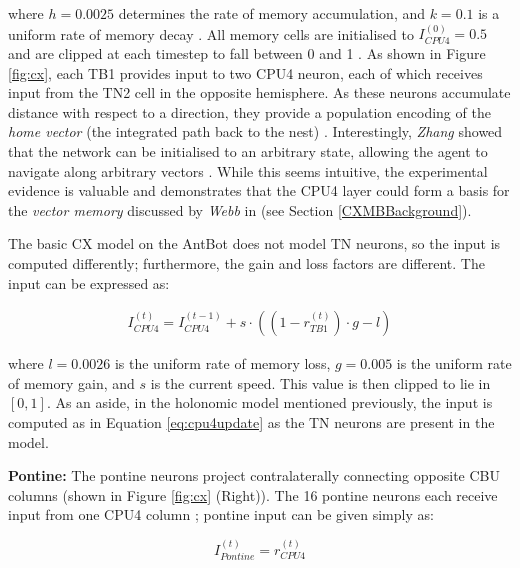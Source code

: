 \documentclass[a4paper,11pt,twoside,openright]{article}
\begin{document}
where $h = 0.0025$ determines the rate of memory accumulation, and $k = 0.1$ is
a uniform rate of memory decay \cite{Stone2017}. All memory cells are initialised
to $I_{CPU4}^{(0)} = 0.5$ and are clipped at each timestep to fall between 0 and
1 \cite{Stone2017}. As shown in Figure \ref{fig:cx}, each TB1 provides input to
two CPU4 neuron, each of which receives input from the TN2 cell in the opposite
hemisphere. As these neurons accumulate distance with respect to a direction,
they provide a population encoding of the \textit{home vector} (the integrated
path back to the nest) \cite{Stone2017}. Interestingly, \textit{Zhang} showed
that the network can be initialised to an arbitrary state, allowing the agent
to navigate along arbitrary vectors \cite{Zhang2017}. While this seems intuitive,
the experimental evidence is valuable and demonstrates that the CPU4 layer could
form a basis for the \textit{vector memory} discussed by \textit{Webb} in
\cite{Webb2019} (see Section \ref{CXMBBackground}).
\newline
\par

The basic CX model on the AntBot does not model TN neurons, so the input is
computed differently; furthermore, the gain and loss factors are different.
The input can be expressed as:

\begin{align}
  I_{CPU4}^{(t)} =
  I_{CPU4}^{(t - 1)} + s \cdot ((1 - r_{TB1}^{(t)}) \cdot g - l)
\end{align}

where $l = 0.0026$ is the uniform rate of memory loss, $g = 0.005$ is the
uniform rate of memory gain, and $s$ is the current speed. This value is
then clipped to lie in $[0,1]$. As an aside, in the holonomic model
mentioned previously, the input is computed as in Equation \ref{eq:cpu4update}
as the TN neurons are present in the model.
\newline\par

\textbf{Pontine:}
The pontine neurons project contralaterally connecting opposite CBU columns
(shown in Figure \ref{fig:cx} (Right)). The 16 pontine neurons each receive input
from one CPU4 column \cite{Stone2017}; pontine input can be given simply as:
\newline
\par

\begin{equation}
  I_{Pontine}^{(t)} = r_{CPU4}^{(t)}
\end{equation}
\end{document}
